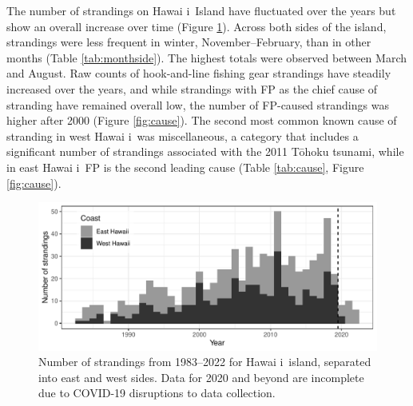 \documentclass[sn-basic,NameDate]{sn-jnl}\usepackage[]{graphicx}\usepackage[]{xcolor}
\makeatletter
\def\maxwidth{ %
  \ifdim\Gin@nat@width>\linewidth
    \linewidth
  \else
    \Gin@nat@width
  \fi
}
\newenvironment{knitrout}{}{} %
\DeclareRobustCommand{\okina}{%
  \raisebox{\dimexpr\fontcharht\font`A-\height}{%
    \scalebox{0.8}{`}%
  }%
}
\newcommand{\Hawaii}{Hawai\okina i}
\makeatother
\begin{document}
The number of strandings on \Hawaii\ Island have fluctuated over the years but show an overall increase over time (Figure \ref{fig:sides}). 
Across both sides of the island, strandings were less frequent in winter, November--February, than in other months (Table \ref{tab:monthside}). 
The highest totals were observed between March and August.
Raw counts of hook-and-line fishing gear strandings have steadily increased over the years, and while strandings with FP as the chief cause of stranding have remained overall low, the number of FP-caused strandings was higher after 2000 (Figure \ref{fig:cause}).
The second most common known cause of stranding in west \Hawaii\ was miscellaneous, a category that includes a significant number of strandings associated with the 2011 T\={o}hoku tsunami, while in east \Hawaii\ FP is the second leading cause (Table \ref{tab:cause}, Figure \ref{fig:cause}).

\begin{figure}[tbp]

\centering
\begin{knitrout}
\color{fgcolor}
\includegraphics[width=\maxwidth]{figure/Figure-2} 
\end{knitrout}
\caption{Number of strandings from 1983--2022 for \Hawaii\ island, separated into east and west sides. Data for 2020 and beyond are incomplete due to COVID-19 disruptions to data collection.}
\label{fig:sides}
\end{figure}
\end{document}
